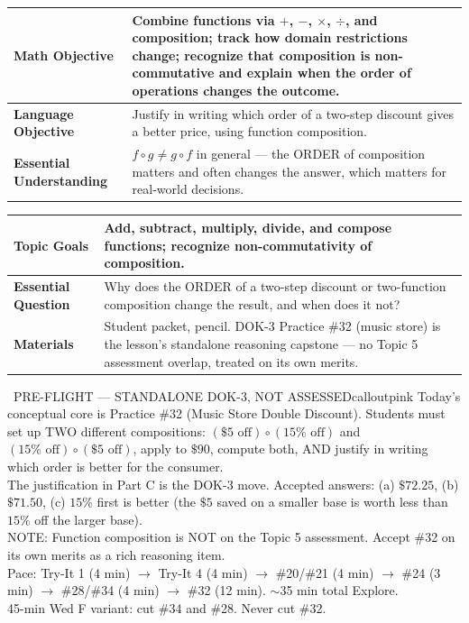 \documentclass[11pt]{article}
\begin{document}

{\small
\renewcommand{\arraystretch}{1.25}
\noindent\begin{tabular}{|p{1.8in}|p{4.8in}|}
\hline
\textbf{Math Objective} & Combine functions via \(+\), \(-\), \(\times\), \(\div\), and composition; track how domain restrictions change; recognize that composition is non-commutative and explain when the order of operations changes the outcome. \\ \hline
\textbf{Language Objective} & Justify in writing which order of a two-step discount gives a better price, using function composition. \\ \hline
\textbf{Essential Understanding} & \(f \circ g \neq g \circ f\) in general --- the ORDER of composition matters and often changes the answer, which matters for real-world decisions. \\ \hline
\end{tabular}
}

{\small
\renewcommand{\arraystretch}{1.25}
\noindent\begin{tabular}{|p{1.8in}|p{4.8in}|}
\hline
\textbf{Topic Goals} & Add, subtract, multiply, divide, and compose functions; recognize non-commutativity of composition. \\ \hline
\textbf{Essential Question} & Why does the ORDER of a two-step discount or two-function composition change the result, and when does it not? \\ \hline
\textbf{Materials} & Student packet, pencil. DOK-3 Practice \#32 (music store) is the lesson's standalone reasoning capstone --- no Topic 5 assessment overlap, treated on its own merits. \\ \hline
\end{tabular}
}

\begin{callout}{\IconPin\ PRE-FLIGHT --- STANDALONE DOK-3, NOT ASSESSED}{calloutpink}
Today's conceptual core is Practice \#32 (Music Store Double Discount). Students must set up TWO different compositions: \((\$5 \text{ off}) \circ (15\% \text{ off})\) and \((15\% \text{ off}) \circ (\$5 \text{ off})\), apply to \(\$90\), compute both, AND justify in writing which order is better for the consumer.\\
The justification in Part C is the DOK-3 move. Accepted answers: (a) \(\$72.25\), (b) \(\$71.50\), (c) \(15\%\) first is better (the \(\$5\) saved on a smaller base is worth less than \(15\%\) off the larger base).\\
NOTE: Function composition is NOT on the Topic 5 assessment. Accept \#32 on its own merits as a rich reasoning item.\\
Pace: Try-It 1 (4 min) \(\rightarrow\) Try-It 4 (4 min) \(\rightarrow\) \#20/\#21 (4 min) \(\rightarrow\) \#24 (3 min) \(\rightarrow\) \#28/\#34 (4 min) \(\rightarrow\) \#32 (12 min). \(\sim\)35 min total Explore.\\
45-min Wed F variant: cut \#34 and \#28. Never cut \#32.
\end{callout}
\end{document}

